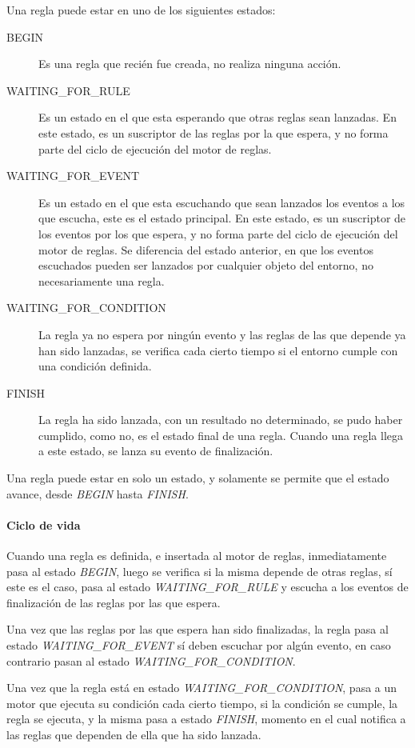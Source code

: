 Una regla puede estar en uno de los siguientes estados:

\begin{description}
\item[BEGIN] Es una regla que recién fue creada, no realiza ninguna
	acción.
\item[WAITING\_FOR\_RULE] Es un estado en el que esta esperando que otras reglas
	sean lanzadas. En este estado, es un suscriptor de las reglas por la que
	espera, y no forma parte del ciclo de ejecución del motor de reglas.
\item[WAITING\_FOR\_EVENT] Es un estado en el que esta escuchando que sean
	lanzados los eventos a los que escucha, este es el estado principal. En
	este estado, es un suscriptor de los eventos por los que espera, y no
	forma parte del ciclo de ejecución del motor de reglas. Se diferencia
	del estado anterior, en que los eventos escuchados pueden ser lanzados
	por cualquier objeto del entorno, no necesariamente una regla.
\item[WAITING\_FOR\_CONDITION] La regla ya no espera por ningún evento y las
	reglas de las que depende ya han sido lanzadas, se verifica cada cierto
	tiempo si el entorno cumple con una condición definida. 
\item[FINISH] La regla ha sido lanzada, con un resultado no determinado, se pudo
	haber cumplido, como no, es el estado final de una regla. Cuando una
	regla llega a este estado, se lanza su evento de finalización.
\end{description}

Una regla puede estar en solo un estado, y solamente se permite que el estado
avance, desde \emph{BEGIN} hasta \emph{FINISH}.


\paragraph{Ciclo de vida}

Cuando una regla es definida, e insertada al motor de reglas, inmediatamente
pasa al estado \emph{BEGIN}, luego se verifica si la misma depende de otras
reglas, sí este es el caso, pasa al estado \emph{WAITING\_FOR\_RULE} y escucha a
los eventos de finalización de las reglas por las que espera.

Una vez que las reglas por las que espera han sido finalizadas, la regla pasa al estado
\emph{WAITING\_FOR\_EVENT} sí deben escuchar por algún evento, en caso contrario
pasan al estado \emph{WAITING\_FOR\_CONDITION}.

Una vez que la regla está en estado \emph{WAITING\_FOR\_CONDITION}, pasa a un
motor que ejecuta su condición cada cierto tiempo, si la condición se cumple, la
regla se ejecuta, y la misma pasa a estado \emph{FINISH}, momento en el cual
notifica a las reglas que dependen de ella que ha sido lanzada.

